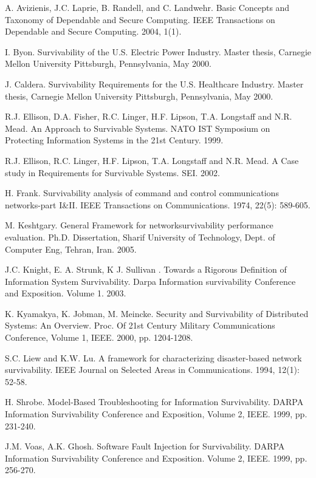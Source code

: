 \documentclass[onecolumn,conference]{IEEEtran}
\begin{document}
    \begin{thebibliography}{00}
         A. Avizienis, J.C. Laprie, B. Randell, and C. Landwehr. Basic Concepts and Taxonomy of Dependable and Secure Computing. IEEE Transactions on Dependable and Secure Computing. 2004, 1(1).

         I. Byon. Survivability of the U.S. Electric Power Industry. Master thesis, Carnegie Mellon University Pittsburgh, Pennsylvania, May 2000.

         J. Caldera. Survivability Requirements for the U.S. Healthcare Industry. Master thesis, Carnegie Mellon University Pittsburgh, Pennsylvania, May 2000.

         R.J. Ellison, D.A. Fisher, R.C. Linger, H.F. Lipson, T.A. Longstaff and N.R. Mead. An Approach to Survivable Systems. NATO IST Symposium on Protecting Information Systems in the 21st Century. 1999.

         R.J. Ellison, R.C. Linger, H.F. Lipson, T.A. Longstaff and N.R. Mead. A Case study in Requirements for Survivable Systems. SEI. 2002.

         H. Frank. Survivability analysis of command and control communications networks-part I\&II. IEEE Transactions on Communications. 1974, 22(5): 589-605.

         M. Keshtgary. General Framework for networksurvivability performance evaluation. Ph.D. Dissertation, Sharif University of Technology, Dept. of Computer Eng, Tehran, Iran. 2005.

        J.C. Knight, E. A. Strunk, K J. Sullivan . Towards a Rigorous Definition of Information System Survivability. Darpa Information survivability Conference and Exposition. Volume 1. 2003.

         K. Kyamakya, K. Jobman, M. Meincke. Security and Survivability of Distributed Systems: An Overview. Proc. Of 21st Century Military Communications Conference, Volume 1, IEEE. 2000, pp. 1204-1208.

         S.C. Liew and K.W. Lu. A framework for characterizing disaster-based network survivability. IEEE Journal on Selected Areas in Communications. 1994, 12(1): 52-58.

         H. Shrobe. Model-Based Troubleshooting for Information Survivability. DARPA Information Survivability Conference and Exposition, Volume 2, IEEE. 1999, pp. 231-240.

         J.M. Voas, A.K. Ghosh. Software Fault Injection for Survivability. DARPA Information Survivability Conference and Exposition. Volume 2, IEEE. 1999, pp. 256-270.


\end{thebibliography}
\end{document}
